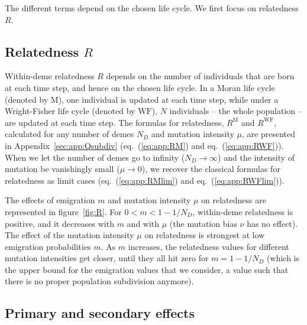 \documentclass[11pt, letterpaper]{article}
\renewcommand{\eqref}[1]{\textup{{\normalfont eq.~(\ref{#1}}\normalfont)}}
\newcommand{\appname}[0]{Appendix}
\newcommand{\Moran}{\textrm{M}}
\newcommand{\WF}{\textrm{WF}}
\newcommand{\ndemes}{N_D}
\begin{document}
The different terms depend on the chosen life cycle. We first focus on relatedness $R$.


\subsection*{Relatedness $R$}

Within-deme relatedness $R$ depends on the number of individuals that are born at each time step, and hence on the chosen life cycle. In a Moran life cycle (denoted by $\Moran$), one individual is updated at each time step, while under a Wright-Fisher life cycle (denoted by $\WF$), $N$ individuals -- the whole population -- are updated at each time step. The formulas for relatedness, $R^{\Moran}$ and $R^{\WF}$, calculated for any number of demes $\ndemes$ and mutation intensity $\mu$, are presented in \appname~\ref{sec:app:Qsubdiv} (\eqref{eq:app:RM} and \eqref{eq:app:RWF}). When we let the number of demes go to infinity ($\ndemes\to \infty$) and the intensity of mutation be vanishingly small ($\mu\to 0$), we recover the classical formulas for relatedness as limit cases (\eqref{eq:app:RMlim} and \eqref{eq:app:RWFlim}). 

The effects of emigration $m$ and mutation intensity $\mu$ on relatedness are represented in figure~\ref{fig:R}. For $0<m<1-1/\ndemes$, within-deme relatedness is positive, and it decreases with $m$ and with $\mu$ (the mutation bias $\nu$ has no effect). The effect of the mutation intensity $\mu$ on relatedness is strongest at low emigration probabilities $m$. As $m$ increases, the relatedness values for different mutation intensities get closer, until they all hit zero for $m=1-1/\ndemes$ (which is the upper bound for the emigration values that we consider, a value such that there is no proper population subdivision anymore). 


   
 

\subsection*{Primary and secondary effects}
\end{document}
